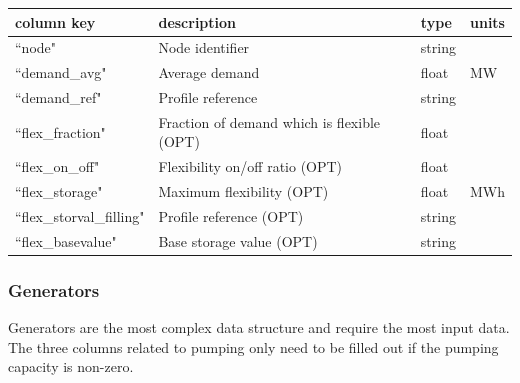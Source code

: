 \documentclass{article}
\begin{document}
\medskip
\begin{tabular}{llll}
	\hline
	column key & description & type & units \\
	\hline
	``node"			& Node identifier 	& string		& \\
	``demand\_avg"		& Average demand	& float		& MW \\
	``demand\_ref"		& Profile reference	& string	&  \\
	``flex\_fraction"		& Fraction of demand which is flexible (OPT) 	& float	& \\
	``flex\_on\_off"		& Flexibility on/off ratio (OPT)		& float		&  \\
	``flex\_storage"				& Maximum flexibility (OPT)	& float		& MWh \\
	``flex\_storval\_filling"		& Profile reference (OPT)	& string	&  \\
	``flex\_basevalue"			& Base storage value (OPT)	& string	& \\
	\hline
\end{tabular}


\subsubsection{Generators}
Generators are the most complex data structure and require the most input data.
The three columns related to pumping only need to be filled out if the pumping capacity is non-zero.
\end{document}
